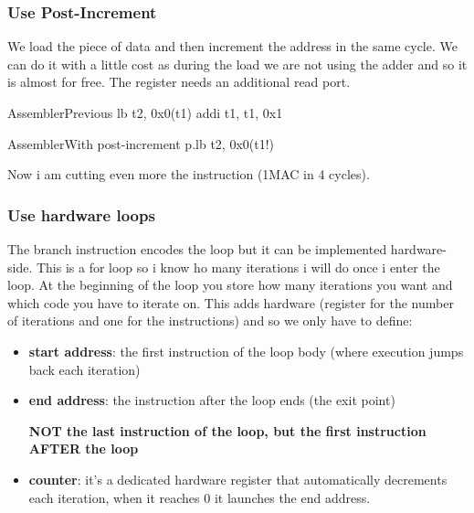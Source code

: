 \subsubsection{Use Post-Increment}
We load the piece of data and then increment the address in the same cycle. We can do it with a little cost as during the load we are not using the adder and so it is almost for free. The register needs an additional read port.

\begin{center}
\begin{minipage}[t]{0.45\textwidth}
\begin{MyCode}{Assembler}{Previous}
lb t2, 0x0(t1)
addi t1, t1, 0x1
\end{MyCode}
\end{minipage}
\hfill
\begin{minipage}[t]{0.45\textwidth}
\begin{MyCode}{Assembler}{With post-increment}
p.lb t2, 0x0(t1!)
\end{MyCode}
\end{minipage}
\end{center}

Now i am cutting even more the instruction (1MAC in 4 cycles).

\subsubsection{Use hardware loops}
The branch instruction encodes the loop but it can be implemented hardware-side. This is a for loop so i know ho many iterations i will do once i enter the loop. At the beginning of the loop you store how many iterations you want and which code you have to iterate on. This adds hardware (register for the number of iterations and one for the instructions) and so we only have to define:
\begin{itemize}
    \item \textbf{start address}: the first instruction of the loop body (where execution jumps back each iteration)
    \item \textbf{end address}: the instruction after the loop ends (the exit point)
    \begin{mybox}
        \textbf{ NOT the last instruction of the loop, but the first instruction AFTER the loop }
    \end{mybox}
    \item \textbf{counter}: it's a dedicated hardware register that automatically decrements each iteration, when it reaches 0 it launches the end address.
\end{itemize}

